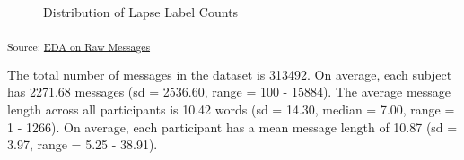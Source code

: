 \documentclass[
  letterpaper,
  DIV=11,
  numbers=noendperiod]{scrartcl}
\begin{document}
\begin{figure}[H]


\caption{\label{fig-lapse_count}Distribution of Lapse Label Counts}

\end{figure}%

\textsubscript{Source:
\href{https://jjcurtin.github.io/study_messages/notebooks/fig_eda_messages-preview.html\#cell-fig-lapse_count}{EDA
on Raw Messages}}

The total number of messages in the dataset is 313492. On average, each
subject has 2271.68 messages (sd = 2536.60, range = 100 - 15884). The
average message length across all participants is 10.42 words (sd =
14.30, median = 7.00, range = 1 - 1266). On average, each participant
has a mean message length of 10.87 (sd = 3.97, range = 5.25 - 38.91).
\end{document}
